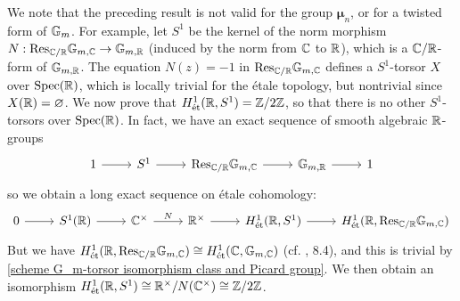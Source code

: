 \begin{remark}
We note that the preceding result is not valid for the group $\bm{\mu}_n$, or for a twisted form of $\mathbb{G}_m$. For example, let $S^1$ be the kernel of the norm morphism $N:\mathrm{Res}_{\mathbb{C}/\mathbb{R}}\mathbb{G}_{m,\mathbb{C}}\to\mathbb{G}_{m,\mathbb{R}}$ (induced by the norm from $\mathbb{C}$ to $\mathbb{R}$), which is a $\mathbb{C}/\mathbb{R}$-form of $\mathbb{G}_{m,\mathbb{R}}$. The equation $N(z)=-1$ in $\mathrm{Res}_{\mathbb{C}/\mathbb{R}}\mathbb{G}_{m,\mathbb{C}}$ defines a $S^1$-torsor $X$ over $\mathrm{Spec}(\mathbb{R})$, which is locally trivial for the \'etale topology, but nontrivial since $X(\mathbb{R})=\varnothing$. We now prove that $H_{\textup{\'et}}^1(\mathbb{R},S^1)=\mathbb{Z}/2\mathbb{Z}$, so that there is no other $S^1$-torsors over $\mathrm{Spec}(\mathbb{R})$. In fact, we have an exact sequence of smooth algebraic $\mathbb{R}$-groups
\[\begin{tikzcd}
1\ar[r]&S^1\ar[r]&\Res_{\C/\R}\G_{m,\C}\ar[r]&\G_{m,\R}\ar[r]&1
\end{tikzcd}\]
so we obtain a long exact sequence on \'etale cohomology:
\[\begin{tikzcd}
0\ar[r]&S^1(\R)\ar[r]&\C^\times\ar[r,"N"]&\R^\times\ar[r]&H^1_{\et}(\R,S^1)\ar[r]&H^1_{\et}(\R,\Res_{\C/\R}\G_{m,\C})
\end{tikzcd}\]
But we have $H_{\textup{\'et}}^1(\mathbb{R},\mathrm{Res}_{\mathbb{C}/\mathbb{R}}\mathbb{G}_{m,\mathbb{C}})\cong H^1_{\textup{\'et}}(\mathbb{C},\mathbb{G}_{m,\mathbb{C}})$ (cf. \cite{SGA3-3} , 8.4), and this is trivial by \cref{scheme G_m-torsor isomorphism class and Picard group}. We then obtain an isomorphism $H^1_{\textup{\'et}}(\mathbb{R},S^1)\cong\mathbb{R}^\times/N(\mathbb{C}^\times)\cong\mathbb{Z}/2\mathbb{Z}$.
\end{remark}

